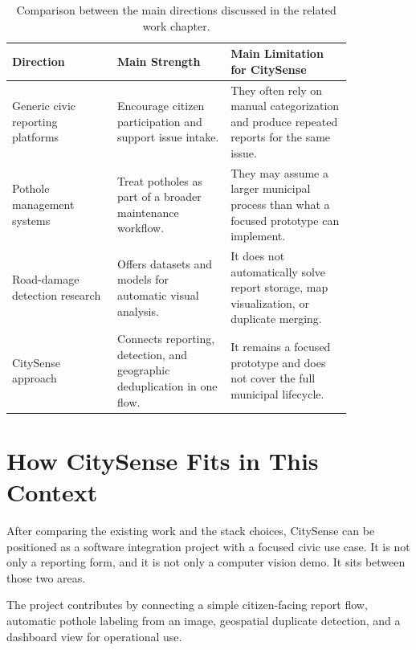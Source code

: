 \begin{table}[htbp]
\centering
\begin{tabular}{>{\raggedright\arraybackslash}p{0.26\linewidth} >{\raggedright\arraybackslash}p{0.28\linewidth} >{\raggedright\arraybackslash}p{0.30\linewidth}}
\toprule
\textbf{Direction} & \textbf{Main Strength} & \textbf{Main Limitation for CitySense} \\
\midrule
Generic civic reporting platforms & Encourage citizen participation and support issue intake. & They often rely on manual categorization and produce repeated reports for the same issue. \\
Pothole management systems & Treat potholes as part of a broader maintenance workflow. & They may assume a larger municipal process than what a focused prototype can implement. \\
Road-damage detection research & Offers datasets and models for automatic visual analysis. & It does not automatically solve report storage, map visualization, or duplicate merging. \\
CitySense approach & Connects reporting, detection, and geographic deduplication in one flow. & It remains a focused prototype and does not cover the full municipal lifecycle. \\
\bottomrule
\end{tabular}
\caption{Comparison between the main directions discussed in the related work chapter.}
\label{tab:related_work_comparison}
\end{table}

\section{How CitySense Fits in This Context}

After comparing the existing work and the stack choices, CitySense can be positioned as a software integration project with a focused civic use case. It is not only a reporting form, and it is not only a computer vision demo. It sits between those two areas.

The project contributes by connecting a simple citizen-facing report flow, automatic pothole labeling from an image, geospatial duplicate detection, and a dashboard view for operational use.

